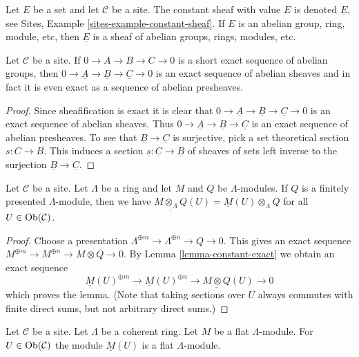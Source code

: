 \noindent
Let $E$ be a set and let $\mathcal{C}$ be a site. The constant
sheaf with value $E$ is denoted $\underline{E}$, see
Sites, Example \ref{sites-example-constant-sheaf}.
If $E$ is an abelian group, ring, module, etc,
then $\underline{E}$ is a sheaf of abelian groups, rings, modules, etc.

\begin{lemma}
\label{lemma-constant-exact}
Let $\mathcal{C}$ be a site. If $0 \to A \to B \to C \to 0$
is a short exact sequence of abelian groups, then
$0 \to \underline{A} \to \underline{B} \to \underline{C} \to 0$
is an exact sequence of abelian sheaves and in fact it is even
exact as a sequence of abelian presheaves.
\end{lemma}

\begin{proof}
Since sheafification is exact it is clear that
$0 \to \underline{A} \to \underline{B} \to \underline{C} \to 0$
is an exact sequence of abelian sheaves. Thus
$0 \to \underline{A} \to \underline{B} \to \underline{C}$
is an exact sequence of abelian presheaves. To see that
$\underline{B} \to \underline{C}$ is surjective, pick a
set theoretical section $s : C \to B$. This induces a
section $\underline{s} : \underline{C} \to \underline{B}$
of sheaves of sets left inverse to the surjection
$\underline{B} \to \underline{C}$.
\end{proof}

\begin{lemma}
\label{lemma-tensor-with-finitely-presented}
Let $\mathcal{C}$ be a site. Let $\Lambda$ be a ring and let $M$
and $Q$ be $\Lambda$-modules. If $Q$ is a finitely presented
$\Lambda$-module, then we have
$\underline{M \otimes_\Lambda Q}(U) = \underline{M}(U) \otimes_\Lambda Q$
for all $U \in \mathop{\mathrm{Ob}}\nolimits(\mathcal{C})$.
\end{lemma}

\begin{proof}
Choose a presentation $\Lambda^{\oplus m} \to \Lambda^{\oplus n} \to Q \to 0$.
This gives an exact sequence
$M^{\oplus m} \to M^{\oplus n} \to M \otimes Q \to 0$.
By Lemma \ref{lemma-constant-exact} we obtain an exact sequence
$$
\underline{M}(U)^{\oplus m} \to
\underline{M}(U)^{\oplus n} \to
\underline{M \otimes Q}(U) \to 0
$$
which proves the lemma. (Note that taking sections over $U$ always
commutes with finite direct sums, but not arbitrary direct sums.)
\end{proof}

\begin{lemma}
\label{lemma-flat-sections}
Let $\mathcal{C}$ be a site. Let $\Lambda$ be a coherent ring.
Let $M$ be a flat $\Lambda$-module. For $U \in \mathop{\mathrm{Ob}}\nolimits(\mathcal{C})$ the
module $\underline{M}(U)$ is a flat $\Lambda$-module.
\end{lemma}

